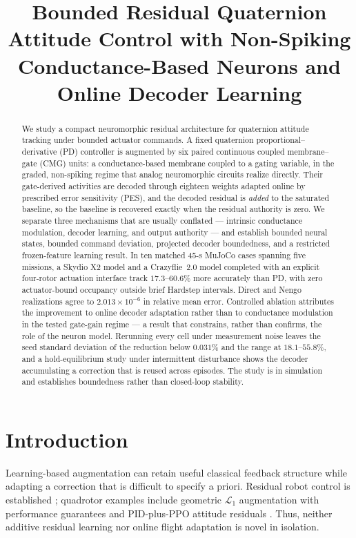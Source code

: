 \documentclass[letterpaper,10pt,conference]{IEEEtran}
\title{Bounded Residual Quaternion Attitude Control with Non-Spiking
Conductance-Based Neurons and Online Decoder Learning}
\author{%
\IEEEauthorblockN{Gandhi Contreras\IEEEauthorrefmark{1}, Steven Sandoval\IEEEauthorrefmark{1}, Luis Garcia\IEEEauthorrefmark{2}}%
\IEEEauthorblockA{\IEEEauthorrefmark{1}New Mexico State University (NMSU), Las Cruces, NM, USA}%
\IEEEauthorblockA{\IEEEauthorrefmark{2}U.S. Air Force, Los Alamos, NM, USA}%
}
\begin{document}
\maketitle
\thispagestyle{empty}
\pagestyle{empty}

\begin{abstract}
We study a compact neuromorphic residual architecture for quaternion attitude
tracking under bounded actuator commands. A fixed quaternion
proportional--derivative (PD) controller is augmented by six paired
continuous coupled membrane--gate (CMG) units: a conductance-based membrane
coupled to a gating variable, in the graded, non-spiking regime that analog
neuromorphic circuits realize directly. Their gate-derived activities are
decoded through eighteen weights adapted online by prescribed error
sensitivity (PES), and the decoded residual is \emph{added} to the saturated
baseline, so the baseline is recovered exactly when the residual authority is
zero. We separate three mechanisms that are usually conflated --- intrinsic
conductance modulation, decoder learning, and output authority --- and
establish bounded neural states, bounded command deviation, projected decoder
boundedness, and a restricted frozen-feature learning result. In ten matched
45-s MuJoCo cases spanning five missions, a Skydio X2 model and a
Crazyflie~2.0 model completed with an explicit four-rotor actuation interface
track $17.3$--$60.6\%$ more accurately than PD, with zero actuator-bound
occupancy outside brief Hardstep intervals. Direct and Nengo realizations
agree to $2.013\times10^{-6}$ in relative mean error. Controlled ablation
attributes the improvement to online decoder adaptation rather than to
conductance modulation in the tested gate-gain regime --- a result that
constrains, rather than confirms, the role of the neuron model. Rerunning every cell under measurement noise leaves the seed
standard deviation of the reduction below $0.031\%$ and the range at
$18.1$--$55.8\%$, and a hold-equilibrium study under intermittent
disturbance shows the decoder accumulating a correction that is reused
across episodes. The study is in simulation and establishes boundedness
rather than closed-loop stability.
\end{abstract}

\section{Introduction}
Learning-based augmentation can retain useful classical feedback structure
while adapting a correction that is difficult to specify a priori.
Residual robot control is established \cite{johannink2019}; quadrotor
examples include geometric $\mathcal L_1$ augmentation with performance
guarantees \cite{wu2025l1quad} and PID-plus-PPO attitude residuals
\cite{li2027hpappo}. Thus, neither additive residual learning nor online
flight adaptation is novel in isolation.
\end{document}
